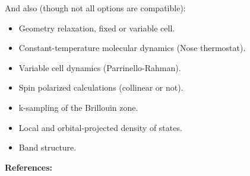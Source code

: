 \documentclass[11pt]{article}
\begin{document}
And also (though not all options are compatible):
\begin{itemize}
\item Geometry relaxation, fixed or variable cell.
\item Constant-temperature molecular dynamics (Nose thermostat).
\item Variable cell dynamics (Parrinello-Rahman).
\item Spin polarized calculations (collinear or not).
\item k-sampling of the Brillouin zone.
\item Local and orbital-projected density of states.
\item Band structure.
\end{itemize}

{\large {\bf References:} }
\end{document}
